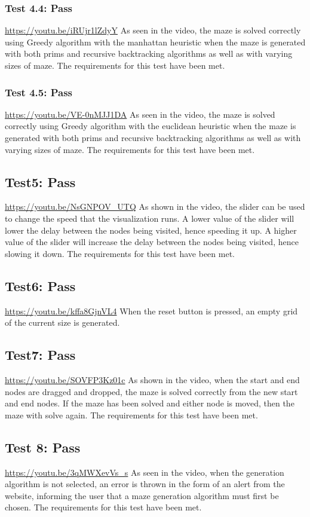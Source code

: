 \documentclass[titlepage]{article}
\begin{document}
\subsubsection*{Test 4.4: Pass}
\url{https://youtu.be/iRUjr1lZdyY}
As seen in the video, the maze is solved correctly using Greedy algorithm with the manhattan heuristic when the maze is generated with both prims and recursive backtracking algorithms as well as with varying sizes of maze. The requirements for this test have been met.
\subsubsection*{Test 4.5: Pass}
\url{https://youtu.be/VE-0nMJJ1DA}
As seen in the video, the maze is solved correctly using Greedy algorithm with the euclidean heuristic when the maze is generated with both prims and recursive backtracking algorithms as well as with varying sizes of maze. The requirements for this test have been met.
\subsection*{Test5: Pass}
\url{https://youtu.be/NsGNPOV_UTQ}
As shown in the video, the slider can be used to change the speed that the visualization runs. A lower value of the slider will lower the delay between the nodes being visited, hence speeding it up. A higher value of the slider will increase the delay between the nodes being visited, hence slowing it down. The requirements for this test have been met.
\subsection*{Test6: Pass}
\url{https://youtu.be/kffa8GjnVL4}
When the reset button is pressed, an empty grid of the current size is generated.
\subsection*{Test7: Pass}
\url{https://youtu.be/SOVFP3Kz01c}
As shown in the video, when the start and end nodes are dragged and dropped, the maze is solved correctly from the new start and end nodes. If the maze has been solved and either node is moved, then the maze with solve again. The requirements for this test have been met.
\subsection{Test 8: Pass}
\url{https://youtu.be/3qMWXevVs_s}
As seen in the video, when the generation algorithm is not selected, an error is thrown in the form of an alert from the website, informing the user that a maze generation algorithm must first be chosen. The requirements for this test have been met.
\end{document}
